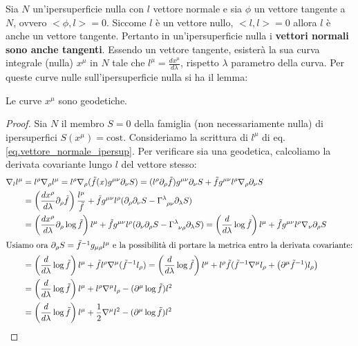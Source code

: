 Sia $N$ un'ipersuperficie nulla con $l$ vettore normale e sia $\phi$ un vettore tangente a $N$, ovvero $<\phi, l> = 0$.  Siccome $l$ è un vettore nullo, $<l,l> = 0$ allora $l$ è anche un vettore tangente. Pertanto in un'ipersuperficie nulla i \textbf{vettori normali sono anche tangenti}. Essendo un vettore tangente, esisterà la sua curva integrale (nulla) $x^\mu$ in $N$ tale che $l^\mu = \frac{dx^\mu}{d\lambda}$, rispetto $\lambda$ parametro della curva.
Per queste curve nulle sull'ipersuperficie nulla si ha il lemma:
\begin{lemma}
Le curve $x^\mu$ sono geodetiche.
\end{lemma}
\begin{proof}
Sia $N$ il membro $S=0$ della famiglia (non necessariamente nulla) di ipersuperfici $S(x^\mu) = \textrm{cost.}$
Consideriamo la scrittura di $l^\mu$ di eq.\ref{eq.vettore_normale_ipersup}. Per verificare sia una geodetica, calcoliamo la derivata covariante lungo $l$ del vettore stesso:
\begin{align}
    \nabla_l l^\mu &= l^\rho \nabla_\rho l^\mu =  l^\rho \nabla_\rho (\Tilde{f}(x)g^{\mu\nu}\partial_\nu S ) = (l^\rho \partial_\rho \Tilde{f}) g^{\mu\nu}\partial_\nu S + \Tilde{f}g^{\mu\nu}l^\rho \nabla_\rho \partial_\nu S \nonumber \\
    &= \left(\frac{dx^\rho}{d\lambda} \partial_\rho \Tilde{f} \right) \frac{l^\mu}{\Tilde{f}} + \Tilde{f}g^{\mu\nu}l^\rho (\partial_\rho\partial_\nu S - \tensor{\Gamma}{^\lambda_{\rho\nu}}\partial_\lambda S)  \nonumber\\
    &= \left(\frac{dx^\rho}{d\lambda}\partial_\rho\log\Tilde{f}\right)l^\mu + \Tilde{f}g^{\mu\nu}l^\rho (\partial_\nu\partial_\rho S - \tensor{\Gamma}{^\lambda_{\nu\rho}}\partial_\lambda S) = \left( \frac{d}{d\lambda}\log\Tilde{f}\right)l^\mu + \Tilde{f}g^{\mu\nu}l^\rho \nabla_\nu\partial_\rho S \nonumber \\
    \intertext{Usiamo ora $\partial_\rho S = \Tilde{f}^{-1}g_{\mu\rho}l^\mu$ e la possibilità di portare la metrica entro la derivata covariante:}
    &= \left( \frac{d}{d\lambda}\log\Tilde{f}\right)l^\mu + \Tilde{f}l^\rho \nabla^\mu(\Tilde{f}^{-1}l_\rho) = \left( \frac{d}{d\lambda}\log\Tilde{f}\right)l^\mu + l^\rho \Tilde{f}( \Tilde{f}^{-1}\nabla^\mu l_\rho + \left(\partial^\mu\Tilde{f}^{-1})l_\rho\right) \nonumber \\
    &= \left( \frac{d}{d\lambda}\log\Tilde{f}\right)l^\mu + l^\rho \nabla^\mu l_\rho - (\partial^\mu\log\Tilde{f})l^2 \nonumber \\
    &= \left( \frac{d}{d\lambda}\log\Tilde{f}\right)l^\mu  + \frac{1}{2}\nabla^\mu l^2 - (\partial^\mu \log\Tilde{f})l^2 \label{eq.ipersup_nulla_geodesica}

\end{align}
\end{proof}
